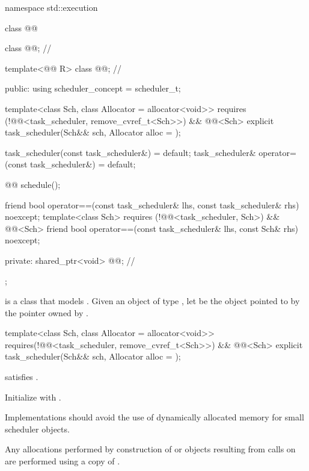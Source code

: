 \begin{codeblock}
namespace std::execution {
  class @@ {
    class @@;                    // \expos

    template<@@ R>
      class @@;                      // \expos

  public:
    using scheduler_concept = scheduler_t;

    template<class Sch, class Allocator = allocator<void>>
      requires (!@@<task_scheduler, remove_cvref_t<Sch>>)
        && @@<Sch>
    explicit task_scheduler(Sch&& sch, Allocator alloc = {});

    task_scheduler(const task_scheduler&) = default;
    task_scheduler& operator=(const task_scheduler&) = default;

    @@ schedule();

    friend bool operator==(const task_scheduler& lhs, const task_scheduler& rhs)
        noexcept;
    template<class Sch>
      requires (!@@<task_scheduler, Sch>)
      && @@<Sch>
    friend bool operator==(const task_scheduler& lhs, const Sch& rhs) noexcept;

  private:
    shared_ptr<void> @@; // \expos
  };
}
\end{codeblock}

\pnum
{} is a class that models
.
Given an object  of type , let
 be the object
pointed to by the pointer owned by .

\begin{itemdecl}
template<class Sch, class Allocator = allocator<void>>
  requires(!@@<task_scheduler, remove_cvref_t<Sch>>) && @@<Sch>
explicit task_scheduler(Sch&& sch, Allocator alloc = {});
\end{itemdecl}
\begin{itemdescr}
\pnum
\mandates
{} satisfies .

\pnum
\effects
Initialize  with
.

\pnum
\recommended
Implementations should avoid the use of dynamically
allocated memory for small scheduler objects.

\pnum
\remarks
Any allocations performed by construction of  or
 objects resulting from calls on  are
performed using a copy of .
\end{itemdescr}

